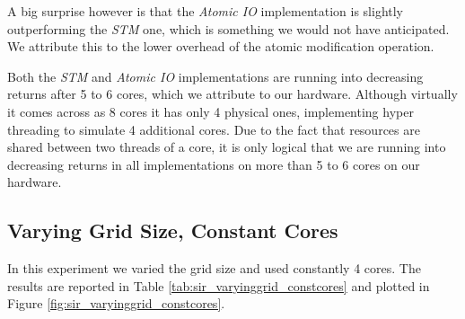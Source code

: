 A big surprise however is that the \textit{Atomic IO} implementation is slightly outperforming the \textit{STM} one, which is something we would not have anticipated. We attribute this to the lower overhead of the atomic modification operation.

Both the \textit{STM} and \textit{Atomic IO} implementations are running into decreasing returns after 5 to 6 cores, which we attribute to our hardware. Although virtually it comes across as 8 cores it has only 4 physical ones, implementing hyper threading to simulate 4 additional cores. Due to the fact that resources are shared between two threads of a core, it is only logical that we are running into decreasing returns in all implementations on more than 5 to 6 cores on our hardware.


\subsection{Varying Grid Size, Constant Cores}
In this experiment we varied the grid size and used constantly 4 cores. %
The results are reported in Table \ref{tab:sir_varyinggrid_constcores} and plotted in Figure \ref{fig:sir_varyinggrid_constcores}.

